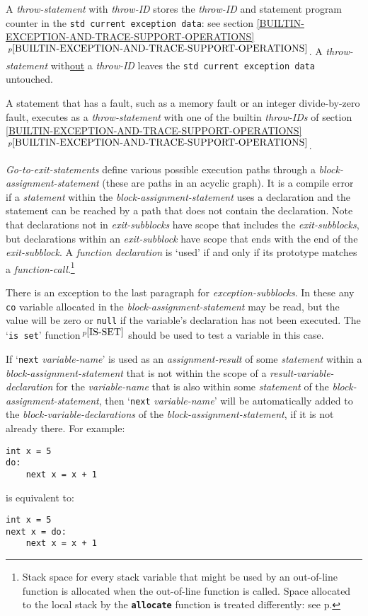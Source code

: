 \documentclass[12pt]{article}
\newcommand{\TT}[1]{{\tt \bfseries #1}}
\newcommand{\itemref}[1]{\ref{#1}$\,^{p\pageref{#1}}$}
\newcommand{\pagref}[1]{p\pageref{#1}}
\newcommand{\pagnote}[1]{$\,^{p\pageref{#1}}$}
\newenvironment{indpar}[1][0.3in]%
	{\begin{list}{}%
		     {\setlength{\itemsep}{0in}%
		      \setlength{\topsep}{0in}%
		      \setlength{\parsep}{1ex}%
		      \setlength{\labelwidth}{#1}%
		      \setlength{\leftmargin}{#1}%
		      \addtolength{\leftmargin}{\labelsep}}%
	 \item}%
	{\end{list}}
\begin{document}
A {\em throw-statement} with {\em throw-ID} stores the {\em throw-ID}
and statement program counter in the {\tt std current exception data}:
see section \itemref{BUILTIN-EXCEPTION-AND-TRACE-SUPPORT-OPERATIONS}.
A {\em throw-statement} with\underline{out} a {\em throw-ID}
leaves the {\tt std current exception data} untouched.

A statement that has a fault,
such as a memory fault or an integer divide-by-zero fault,
executes as a {\em throw-statement} with one of the builtin {\em throw-IDs}
of section \itemref{BUILTIN-EXCEPTION-AND-TRACE-SUPPORT-OPERATIONS}.

{\em Go-to-exit-statements} define various possible execution
paths through a {\em block-assignment-statement}
(these are paths in an acyclic graph).
It is a compile error if a {\em statement}
within the {\em block-assignment-statement}
uses a declaration and the statement can be reached by a path that
does not contain the declaration.
Note that declarations not in {\em exit-subblocks} have scope
that includes the {\em exit-subblocks}, but declarations
within an {\em exit-subblock} have scope that ends with the end of
the {\em exit-subblock}.  A {\em function declaration}
is `used' if and only if its
prototype matches a {\em function-call}.\footnote{Stack space for every
stack variable that might be used by an out-of-line function is
allocated when the out-of-line function is called.  Space allocated
to the local stack
by the \TT{allocate} function is treated differently:  see
\pagref{OUT-OF-LINE-LOCALS}.}

There is an exception to the last paragraph for {\em exception-subblocks}.
In these any {\tt co} variable allocated in the
{\em block-assignment-statement} may be read, but the value will
be zero or {\tt null} if the variable's declaration has not been
executed.  The `{\tt is set}' function\pagnote{IS-SET} should be
used to test a variable in this case.

If\label{BLOCK-NEXT-PROMOTION} `{\tt next} {\em variable-name}' is used as an
{\em assignment-result} of some {\em statement} within a
{\em block-assignment-statement} that is not within the scope of
a {\em result-variable-declaration} for the {\em variable-name}
that is also within some {\em statement} of the
{\em block-assignment-statement},
then `{\tt next} {\em variable-name}' will be automatically added
to the {\em block-variable-declarations}
of the {\em block-assignment-state\-ment},
if it is not already there.  For example:
\begin{indpar}\begin{verbatim}
int x = 5
do:
    next x = x + 1
\end{verbatim}\end{indpar}
is equivalent to:
\begin{indpar}\begin{verbatim}
int x = 5
next x = do:
    next x = x + 1
\end{verbatim}\end{indpar}
\end{document}
